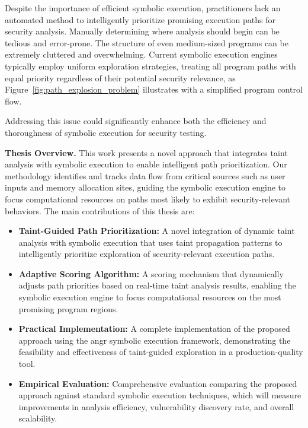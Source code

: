 Despite the importance of efficient symbolic execution, practitioners lack an automated method to intelligently prioritize promising execution paths for security analysis. Manually determining where analysis should begin can be tedious and error-prone. The structure of even medium-sized programs can be extremely cluttered and overwhelming. Current symbolic execution engines typically employ uniform exploration strategies, treating all program paths with equal priority regardless of their potential security relevance, as Figure~\ref{fig:path_explosion_problem} illustrates with a simplified program control flow.

Addressing this issue could significantly enhance both the efficiency and thoroughness of symbolic execution for security testing.

\textbf{Thesis Overview.} This work presents a novel approach that integrates taint analysis with symbolic execution to enable intelligent path prioritization. Our methodology identifies and tracks data flow from critical sources such as user inputs and memory allocation sites, guiding the symbolic execution engine to focus computational resources on paths most likely to exhibit security-relevant behaviors. The main contributions of this thesis are:

\begin{itemize}
    \item \textbf{Taint-Guided Path Prioritization:} A novel integration of dynamic taint analysis with symbolic execution that uses taint propagation patterns to intelligently prioritize exploration of security-relevant execution paths.

    \item \textbf{Adaptive Scoring Algorithm:} A scoring mechanism that dynamically adjusts path priorities based on real-time taint analysis results, enabling the symbolic execution engine to focus computational resources on the most promising program regions.

    \item \textbf{Practical Implementation:} A complete implementation of the proposed approach using the angr symbolic execution framework, demonstrating the feasibility and effectiveness of taint-guided exploration in a production-quality tool.

    \item \textbf{Empirical Evaluation:} Comprehensive evaluation comparing the proposed approach against standard symbolic execution techniques, which will measure improvements in analysis efficiency, vulnerability discovery rate, and overall scalability.
\end{itemize}

